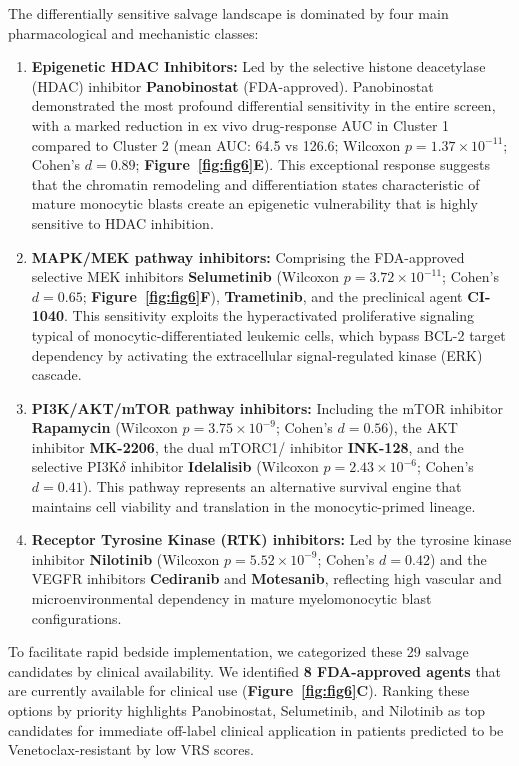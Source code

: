 \documentclass[11pt,a4paper]{article}
\begin{document}
The differentially sensitive salvage landscape is dominated by four main pharmacological and mechanistic classes:
\begin{enumerate}
\item \textbf{Epigenetic HDAC Inhibitors:} Led by the selective histone deacetylase (HDAC) inhibitor \textbf{Panobinostat} (FDA-approved). Panobinostat demonstrated the most profound differential sensitivity in the entire screen, with a marked reduction in ex vivo drug-response AUC in Cluster 1 compared to Cluster 2 (mean AUC: 64.5 vs 126.6; Wilcoxon $p = 1.37 \times 10^{-11}$; Cohen's $d = 0.89$; \textbf{Figure~\ref{fig:fig6}E}). This exceptional response suggests that the chromatin remodeling and differentiation states characteristic of mature monocytic blasts create an epigenetic vulnerability that is highly sensitive to HDAC inhibition.
\item \textbf{MAPK\slash\allowbreak MEK pathway inhibitors:} Comprising the FDA-approved selective MEK inhibitors \textbf{Selumetinib} (Wilcoxon $p = 3.72 \times 10^{-11}$; Cohen's $d = 0.65$; \textbf{Figure~\ref{fig:fig6}F}), \textbf{Trametinib}, and the preclinical agent \textbf{CI-1040}. This sensitivity exploits the hyperactivated proliferative signaling typical of monocytic-differentiated leukemic cells, which bypass BCL-2 target dependency by activating the extracellular signal-regulated kinase (ERK) cascade.
\item \textbf{PI3K\slash\allowbreak AKT\slash\allowbreak mTOR pathway inhibitors:} Including the mTOR inhibitor \textbf{Rapamycin} (Wilcoxon $p = 3.75 \times 10^{-9}$; Cohen's $d = 0.56$), the AKT inhibitor \textbf{MK-2206}, the dual mTORC1\slash{} inhibitor \textbf{INK-128}, and the selective PI3K$\delta$ inhibitor \textbf{Idelalisib} (Wilcoxon $p = 2.43 \times 10^{-6}$; Cohen's $d = 0.41$). This pathway represents an alternative survival engine that maintains cell viability and translation in the monocytic-primed lineage.
\item \textbf{Receptor Tyrosine Kinase (RTK) inhibitors:} Led by the tyrosine kinase inhibitor \textbf{Nilotinib} (Wilcoxon $p = 5.52 \times 10^{-9}$; Cohen's $d = 0.42$) and the VEGFR inhibitors \textbf{Cediranib} and \textbf{Motesanib}, reflecting high vascular and microenvironmental dependency in mature myelomonocytic blast configurations.
\end{enumerate}

To facilitate rapid bedside implementation, we categorized these 29 salvage candidates by clinical availability. We identified \textbf{8 FDA-approved agents} that are currently available for clinical use (\textbf{Figure~\ref{fig:fig6}C}). Ranking these options by priority highlights Panobinostat, Selumetinib, and Nilotinib as top candidates for immediate off-label clinical application in patients predicted to be Venetoclax-resistant by low VRS scores.
\end{document}
